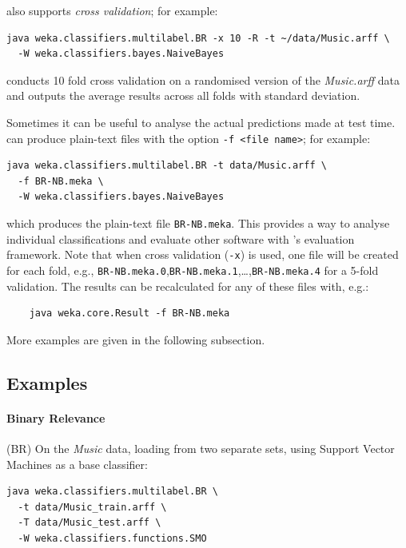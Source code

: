 \documentclass[11pt]{article}
\newcommand{\MEKA}{Meka}
\begin{document}
\framework{\MEKA} also supports \emph{cross validation}; for example:
\begin{verbatim}
java weka.classifiers.multilabel.BR -x 10 -R -t ~/data/Music.arff \
  -W weka.classifiers.bayes.NaiveBayes
\end{verbatim}
conducts 10 fold cross validation on a randomised version of the \textit{Music.arff} data and outputs the average results across all folds with standard deviation. %

Sometimes it can be useful to analyse the actual predictions made at test time. \framework{\MEKA} can produce plain-text files with the option \texttt{-f <file name>}; for example:
\begin{verbatim}
java weka.classifiers.multilabel.BR -t data/Music.arff \ 
  -f BR-NB.meka \
  -W weka.classifiers.bayes.NaiveBayes
\end{verbatim}
which produces the plain-text file \texttt{BR-NB.meka}. This provides a way to analyse individual classifications and evaluate other software with \framework{\MEKA}'s evaluation framework. Note that when cross validation (\texttt{-x}) is used, one file will be created for each fold, e.g., \texttt{BR-NB.meka.0},\texttt{BR-NB.meka.1},\ldots,\texttt{BR-NB.meka.4} for a 5-fold validation. The results can be recalculated for any of these files with, e.g.:
\begin{verbatim}
	java weka.core.Result -f BR-NB.meka
\end{verbatim}

More examples are given in the following subsection.

\subsection{Examples} 



\paragraph{Binary Relevance} (BR) On the \textit{Music} data, loading from two separate sets, using Support Vector Machines as a base classifier: 
\begin{verbatim}
java weka.classifiers.multilabel.BR \
  -t data/Music_train.arff \
  -T data/Music_test.arff \
  -W weka.classifiers.functions.SMO
\end{verbatim}
\end{document}
